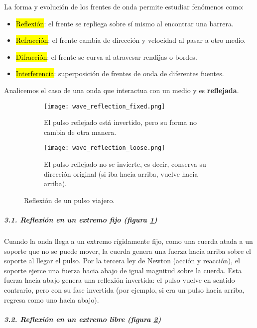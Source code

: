 La forma y evolución de los frentes de onda permite estudiar fenómenos como:
\begin{itemize}
  \item \hl{Reflexión}: el frente se repliega sobre sí mismo al encontrar una barrera.
  \item \hl{Refracción}: el frente cambia de dirección y velocidad al pasar a otro medio.
  \item \hl{Difracción}: el frente se curva al atravesar rendijas o bordes.
  \item \hl{Interferencia}: superposición de frentes de onda de diferentes fuentes.
\end{itemize}

Analicemos el caso de una onda que interactua con un medio y es \textbf{reflejada}.

\begin{figure}[ht]
  \centering
  \begin{subfigure}[b]{0.32\textwidth}
      \centering
      \texttt{[image: wave\_reflection\_fixed.png]}
      \caption{El pulso reflejado está invertido, pero su forma no cambia de otra manera.}
      \label{fig:wave_reflection_fixed}
  \end{subfigure}
  \hspace{80pt}
  \begin{subfigure}[b]{0.32\textwidth}
      \centering
      \texttt{[image: wave\_reflection\_loose.png]}
      \caption{El pulso reflejado no se invierte, es decir, conserva su dirección original (si iba hacia arriba, vuelve hacia arriba).}
      \label{fig:wave_reflection_loose}
  \end{subfigure}
  \caption{Reflexión de un pulso viajero.}
  \label{fig:wave_reflection}
\end{figure}

\subparagraph{3.1. Reflexión en un extremo fijo (figura \ref{fig:wave_reflection_fixed})}

Cuando la onda llega a un extremo rígidamente fijo, como una cuerda atada a un soporte que no se puede mover, la cuerda genera una fuerza hacia arriba sobre el soporte al llegar el pulso. Por la tercera ley de Newton (acción y reacción), el soporte ejerce una fuerza hacia abajo de igual magnitud sobre la cuerda. Esta fuerza hacia abajo genera una reflexión invertida: el pulso vuelve en sentido contrario, pero con su fase invertida (por ejemplo, si era un pulso hacia arriba, regresa como uno hacia abajo).

\subparagraph{3.2. Reflexión en un extremo libre (figura \ref{fig:wave_reflection_loose})}

